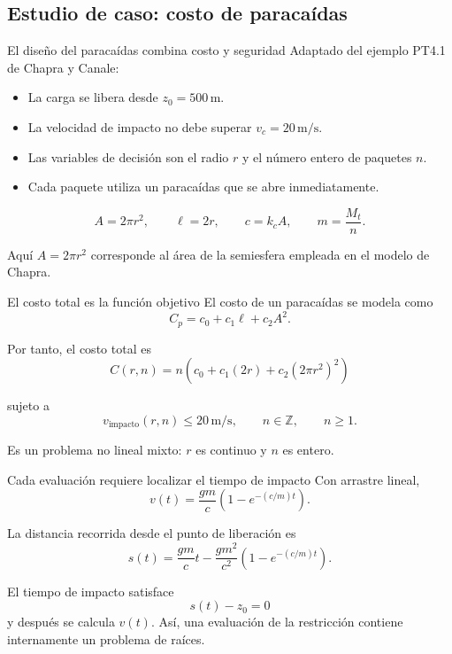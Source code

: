 \documentclass[../../main.tex]{subfiles}
\begin{document}

\subsection{Estudio de caso: costo de paracaídas}

\begin{frame}{El diseño del paracaídas combina costo y seguridad}
Adaptado del ejemplo PT4.1 de Chapra y Canale:
\begin{itemize}
  \item La carga se libera desde $z_0=500\,\mathrm{m}$.
  \item La velocidad de impacto no debe superar $v_c=20\,\mathrm{m/s}$.
  \item Las variables de decisión son el radio $r$ y el número entero de paquetes $n$.
  \item Cada paquete utiliza un paracaídas que se abre inmediatamente.
\end{itemize}

\[
A=2\pi r^2,
\qquad
\ell=2r,
\qquad
c=k_cA,
\qquad
m=\frac{M_t}{n}.
\]

Aquí $A=2\pi r^2$ corresponde al área de la semiesfera empleada en el modelo de Chapra.
\end{frame}

\begin{frame}{El costo total es la función objetivo}
El costo de un paracaídas se modela como
\[
C_p=c_0+c_1\ell+c_2A^2.
\]

Por tanto, el costo total es
\[
\boxed{
C(r,n)=n\left(c_0+c_1(2r)+c_2(2\pi r^2)^2\right)
}
\]

sujeto a
\[
v_{\mathrm{impacto}}(r,n)\le20\,\mathrm{m/s},
\qquad
n\in\mathbb{Z},
\qquad n\ge1.
\]

Es un problema no lineal mixto: $r$ es continuo y $n$ es entero.
\end{frame}

\begin{frame}{Cada evaluación requiere localizar el tiempo de impacto}
Con arrastre lineal,
\[
v(t)=\frac{gm}{c}\left(1-e^{-(c/m)t}\right).
\]

La distancia recorrida desde el punto de liberación es
\[
s(t)=
\frac{gm}{c}t
-
\frac{gm^2}{c^2}
\left(1-e^{-(c/m)t}\right).
\]

El tiempo de impacto satisface
\[
\boxed{
s(t)-z_0=0
}
\]
y después se calcula $v(t)$. Así, una evaluación de la restricción contiene internamente un problema de raíces.
\end{frame}
\end{document}

